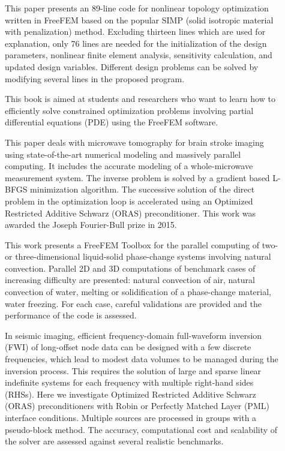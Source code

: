 \begin{description}
\item[] This paper presents an 89-line code for nonlinear topology optimization written in FreeFEM based on the popular SIMP (solid isotropic material with penalization) method. Excluding thirteen lines which are used for explanation, only 76 lines are needed for the initialization of the design parameters, nonlinear finite element analysis, sensitivity calculation, and updated design variables. Different design problems can be solved by modifying several lines in the proposed program.

\item[] This book is aimed at students and researchers who want to learn how to eﬃciently solve constrained optimization problems involving partial diﬀerential equations (PDE) using the FreeFEM software.

\item[] This paper deals with microwave tomography for brain stroke imaging using state-of-the-art numerical modeling and massively parallel computing. It includes the accurate modeling of a whole-microwave measurement system. The inverse problem is solved by a gradient based L-BFGS minimization algorithm. The successive solution of the direct problem in the optimization loop is accelerated using an Optimized Restricted Additive Schwarz (ORAS) preconditioner. This work was awarded the Joseph Fourier-Bull prize in 2015.

\item[] This work presents a FreeFEM Toolbox for the parallel computing of two- or three-dimensional liquid-solid phase-change systems involving natural convection. Parallel 2D and 3D computations of benchmark cases of increasing difficulty are presented: natural convection of air, natural convection of water, melting or solidification of a phase-change material, water freezing. For each case, careful validations are provided and the performance of the code is assessed.

\item[] In seismic imaging, efficient frequency-domain full-waveform inversion (FWI) of long-offset node data can be designed with a few discrete frequencies, which lead to modest data volumes to be managed during the inversion process. This requires the solution of large and sparse linear indefinite systems for each frequency with multiple right-hand sides (RHSs). Here we investigate Optimized Restricted Additive Schwarz (ORAS) preconditioners with Robin or Perfectly Matched Layer (PML) interface conditions. Multiple sources are processed in groups with a pseudo-block method. The accuracy, computational cost and scalability of the solver are assessed against several realistic benchmarks.


\end{description}

